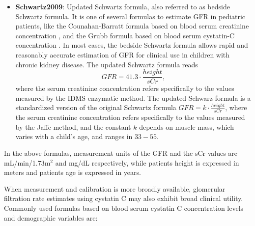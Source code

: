 \documentclass[10pt,final]{siamltex}
\begin{document}
\begin{itemize}
  \item \textbf{Schwartz2009}: Updated Schwartz formula, also referred to as bedside Schwartz formula. It is one of several formulas to estimate GFR in pediatric patients, like the Counahan-Barratt formula based on blood serum creatinine concentration \cite{Counahan}, and the Grubb formula based on blood serum cystatin-C concentration \cite{simonsen}. In most cases, the bedside Schwartz formula allows rapid and reasonably accurate estimation of GFR for clinical use in children with chronic kidney disease. The updated Schwartz formula reads
  \begin{equation}
    \mathit{GFR} = 41.3 \cdot \frac{height}{sCr},
  \end{equation}
  where the serum creatinine concentration refers specifically to the values measured by the IDMS enzymatic method. The updated Schwarz formula is a standardized version of the original Schwartz formula $\mathit{GFR} = k \cdot \tfrac{height}{sCr}$, where the serum creatinine concentration refers specifically to the values measured by the Jaffe method, and the constant $k$ depends on muscle mass, which varies with a child's age, and ranges in $33-55$.
\end{itemize}

In the above formulas, measurement units of the GFR and the sCr values are mL/min/1.73m$^2$ and mg/dL respectively, while patients height is expressed in meters and patients age is expressed in years. %

When measurement and calibration is more broadly available, glomerular filtration rate estimates using cystatin C may also exhibit broad clinical utility. Commonly used formulas based on blood serum cystatin C concentration levels and demographic variables are:
\end{document}
